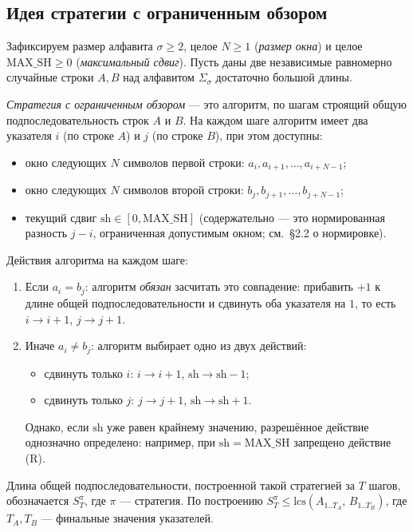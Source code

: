 \subsection{Идея стратегии с ограниченным обзором}

Зафиксируем размер алфавита $\sigma \geq 2$, целое $N \geq 1$ (\emph{размер окна}) и целое $\mathrm{MAX\_SH} \geq 0$ (\emph{максимальный сдвиг}). Пусть даны две независимые равномерно случайные строки $A, B$ над алфавитом $\Sigma_\sigma$ достаточно большой длины.

\emph{Стратегия с ограниченным обзором} --- это алгоритм, по шагам строящий общую подпоследовательность строк $A$ и $B$. На каждом шаге алгоритм имеет два указателя $i$ (по строке $A$) и $j$ (по строке $B$), при этом доступны:
\begin{itemize}
    \item окно следующих $N$ символов первой строки: $a_i, a_{i+1}, \ldots, a_{i+N-1}$;
    \item окно следующих $N$ символов второй строки: $b_j, b_{j+1}, \ldots, b_{j+N-1}$;
    \item текущий сдвиг $\mathrm{sh} \in [0, \mathrm{MAX\_SH}]$ (содержательно --- это нормированная разность $j - i$, ограниченная допустимым окном; см.~\S2.2 о нормировке).
\end{itemize}

Действия алгоритма на каждом шаге:
\begin{enumerate}
    \item Если $a_i = b_j$: алгоритм \emph{обязан} засчитать это совпадение: прибавить $+1$ к длине общей подпоследовательности и сдвинуть оба указателя на $1$, то есть $i \to i+1$, $j \to j+1$.
    \item Иначе $a_i \neq b_j$: алгоритм выбирает одно из двух действий:
    \begin{itemize}
        \item[(L)] сдвинуть только $i$: $i \to i+1$, $\mathrm{sh} \to \mathrm{sh}-1$;
        \item[(R)] сдвинуть только $j$: $j \to j+1$, $\mathrm{sh} \to \mathrm{sh}+1$.
    \end{itemize}
    Однако, если $\mathrm{sh}$ уже равен крайнему значению, разрешённое действие однозначно определено: например, при $\mathrm{sh} = \mathrm{MAX\_SH}$ запрещено действие (R).
\end{enumerate}

Длина общей подпоследовательности, построенной такой стратегией за $T$ шагов, обозначается $S_T^\pi$, где $\pi$ --- стратегия. По построению $S_T^\pi \leq \mathrm{lcs}(A_{1..T_A},\, B_{1..T_B})$, где $T_A, T_B$ --- финальные значения указателей.

